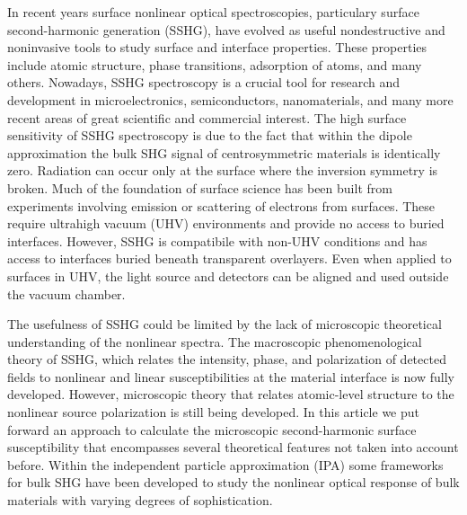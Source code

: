 \documentclass[floatfix,prb,aps,superscriptaddress,showpacs,letterpaper]{revtex4}
\begin{document}
In recent years surface nonlinear optical spectroscopies, particulary surface 
second-harmonic generation (SSHG), have evolved as useful nondestructive 
and noninvasive tools to study surface and interface properties. These 
properties include atomic structure, phase transitions, adsorption of 
atoms, and many others.\cite{daumPRL93, mcgilpOE94, meyerPRL95, powerPRL95, 
godefroyAPL96, hoferAPA96, dadapPRB97, bloembergenAPB99, mcgilpSRL99, 
suzukiAPB99, mitchellSS01, hughesPRB96, guyotPRB88, downerPSSA01, shenAPB99, 
shenNAT89, chenPRL81, mendozaPRL98, downerSIA01} Nowadays, SSHG spectroscopy 
is a crucial tool for research and development in microelectronics,
\cite{zheltikovLP00} semiconductors, \cite{lupkeSSR99} nanomaterials,
\cite{salazar-aparicioPRB14} and many more recent areas of great scientific 
and commercial interest.\cite{cazzanelliNM14} The high surface sensitivity 
of SSHG spectroscopy is due to the fact that within the dipole approximation 
the bulk SHG signal of centrosymmetric materials is identically zero. 
Radiation can occur only at the surface where the inversion symmetry is 
broken. Much of the foundation of surface science has been built from 
experiments involving emission or scattering of electrons from surfaces. 
These require ultrahigh vacuum (UHV) environments and provide no access to 
buried interfaces. However, SSHG is compatibile with non-UHV conditions and 
has access to interfaces buried beneath transparent overlayers. Even when 
applied to surfaces in UHV, the light source and detectors can be aligned and
used outside the vacuum chamber. 

The usefulness of SSHG could be limited by the lack of microscopic theoretical
understanding of the nonlinear spectra. The macroscopic phenomenological 
theory of SSHG, which relates the intensity, phase, and polarization of 
detected fields to nonlinear and linear susceptibilities at the material 
interface is now fully developed. However, microscopic theory that relates 
atomic-level structure to the nonlinear source polarization is still being 
developed. In this article we put forward an approach to calculate the
microscopic second-harmonic surface susceptibility that encompasses several
theoretical features not taken into account before. Within the independent 
particle approximation (IPA) some frameworks for bulk SHG have been developed 
to study the nonlinear optical response of bulk materials with varying degrees 
of sophistication.\cite{butcherPOPS63, aspnesPRB72, sipePRB93, levinePRB94,
aversaPRB95, hughesPRB96, rashkeevPRB98} 
\end{document}
